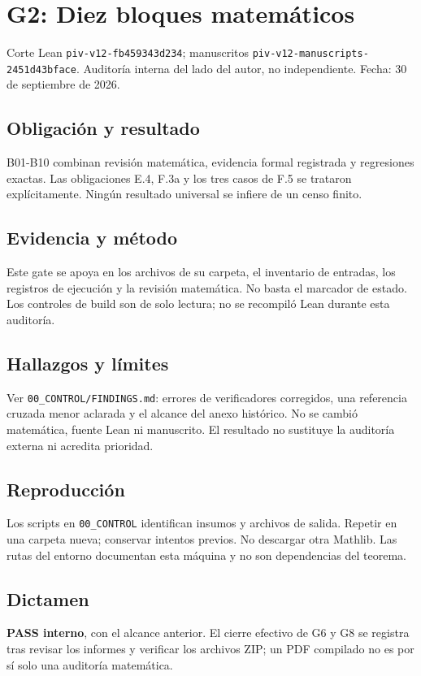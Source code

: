 \documentclass[11pt]{article}
\begin{document}
\section{G2: Diez bloques
matemáticos}\label{g2-diez-bloques-matemuxe1ticos}

Corte Lean \nolinkurl{piv-v12-fb459343d234}; manuscritos
\nolinkurl{piv-v12-manuscripts-2451d43bface}. Auditoría interna del lado
del autor, no independiente. Fecha: 30 de septiembre de 2026.

\subsection{Obligación y resultado}\label{obligaciuxf3n-y-resultado}

B01-B10 combinan revisión matemática, evidencia formal registrada y
regresiones exactas. Las obligaciones E.4, F.3a y los tres casos de F.5
se trataron explícitamente. Ningún resultado universal se infiere de un
censo finito.

\subsection{Evidencia y método}\label{evidencia-y-muxe9todo}

Este gate se apoya en los archivos de su carpeta, el inventario de
entradas, los registros de ejecución y la revisión matemática. No basta
el marcador de estado. Los controles de build son de solo lectura; no se
recompiló Lean durante esta auditoría.

\subsection{Hallazgos y límites}\label{hallazgos-y-luxedmites}

Ver \nolinkurl{00_CONTROL/FINDINGS.md}: errores de verificadores
corregidos, una referencia cruzada menor aclarada y el alcance del anexo
histórico. No se cambió matemática, fuente Lean ni manuscrito. El
resultado no sustituye la auditoría externa ni acredita prioridad.

\subsection{Reproducción}\label{reproducciuxf3n}

Los scripts en \nolinkurl{00_CONTROL} identifican insumos y archivos de
salida. Repetir en una carpeta nueva; conservar intentos previos. No
descargar otra Mathlib. Las rutas del entorno documentan esta máquina y
no son dependencias del teorema.

\subsection{Dictamen}\label{dictamen}

\textbf{PASS interno}, con el alcance anterior. El cierre efectivo de G6
y G8 se registra tras revisar los informes y verificar los archivos ZIP;
un PDF compilado no es por sí solo una auditoría matemática.
\end{document}

